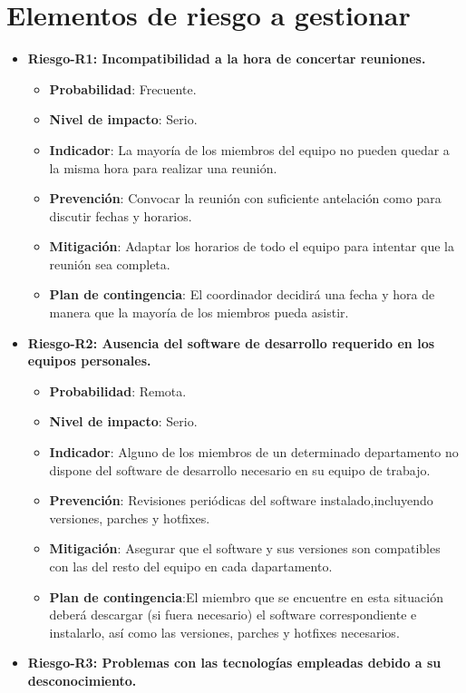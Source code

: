 \chapter{Elementos de riesgo a gestionar}
\begin{itemize}
\item { \bf Riesgo-R1: Incompatibilidad a la hora de concertar reuniones.}
		\begin{itemize}	
		\item{ \bf Probabilidad}: Frecuente.
		\item{ \bf Nivel de impacto}: Serio.
		\item{ \bf Indicador}: La mayoría de los miembros del equipo no pueden quedar a la misma hora para realizar una reunión.
		\item{ \bf Prevención}: Convocar la reunión con suficiente antelación como para discutir	fechas y horarios.
		\item{ \bf Mitigación}: Adaptar los horarios de todo el equipo para intentar que la reunión sea completa.
		\item{ \bf Plan de contingencia}: El coordinador decidirá una fecha y hora de manera que la mayoría de los miembros pueda asistir.\\
		\end{itemize}
\item { \bf Riesgo-R2: Ausencia del software de desarrollo requerido en los equipos personales.}
		\begin{itemize}	
		\item{ \bf Probabilidad}: Remota.
		\item{ \bf Nivel de impacto}: Serio.
		\item{ \bf Indicador}: Alguno de los miembros de un determinado departamento no dispone del software de desarrollo necesario en su equipo de trabajo.
		\item{ \bf Prevención}: Revisiones periódicas del software instalado,incluyendo versiones, parches y hotfixes.
		\item{ \bf Mitigación}: Asegurar que el software y sus versiones son compatibles con las del resto del equipo en cada dapartamento.
		\item{ \bf Plan de contingencia}:El miembro que se encuentre en esta situación deberá descargar (si fuera necesario) el software correspondiente e instalarlo, así	como las versiones, parches y hotfixes necesarios.\\
		\end{itemize}
\item { \bf Riesgo-R3: Problemas con las tecnologías empleadas debido a su desconocimiento.}

\end{itemize}
